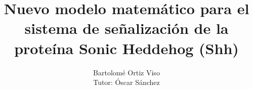 \documentclass[a4paper,12pt,twoside]{report}
\begin{document}
	


\title{\LARGE {\bf Nuevo modelo matemático para el sistema de señalización de la proteína Sonic Heddehog (Shh) }\\
 \vspace*{6mm}
}

\author{Bartolomé Ortiz Viso\\Tutor: Óscar Sánchez }

\narrowlinespacing
\maketitle

\preface




\body










\appendix

\end{document}
